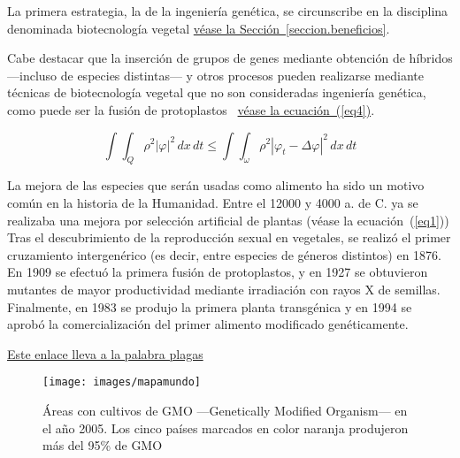 \documentclass[11pt,a4paper]{article}
\begin{document}
La primera estrategia, la de la ingeniería genética, se circunscribe en la disciplina denominada biotecnología vegetal
%
%
\hyperref[seccion.beneficios]{véase la Sección~\ref{seccion.beneficios}}.


Cabe destacar que la inserción de grupos de genes mediante obtención de híbridos ---incluso de especies distintas--- y otros procesos pueden realizarse mediante técnicas de biotecnología vegetal que no son consideradas ingeniería genética, como puede ser la fusión de protoplastos~\cite{padula1}
%
%
\hyperref[eq4]{véase la ecuación~(\ref{eq4})}.




\begin{equation}\label{eq1}
\int\!\!\!\int_Q\rho^2|\varphi|^2\,dx\,dt
\le
\int\!\!\!\int_\omega\rho^2|\varphi_t-\Delta\varphi|^2\,dx\,dt
\end{equation}



La mejora de las especies que serán usadas como alimento ha sido un motivo común en la historia de la Humanidad.
 Entre el 12000 y 4000 a. de C. ya se realizaba una mejora por selección artificial de plantas (véase la ecuación~(\ref{eq1})) Tras el descubrimiento de la reproducción sexual en vegetales, se realizó el primer cruzamiento intergenérico (es decir, entre especies de géneros distintos) en 1876. En 1909 se efectuó la primera fusión de protoplastos, y en 1927 se obtuvieron mutantes de mayor productividad mediante irradiación con rayos X de semillas.
Finalmente, en 1983 se produjo la primera planta transgénica y en 1994 se aprobó la comercialización del primer alimento modificado genéticamente.\cite{simon3}

%
%

\hyperlink{target.plagas}{Este enlace lleva a la palabra plagas}


\begin{figure}[h]
\centering
\texttt{[image: images/mapamundo]}
\caption[Producción mundial de GMO]{Áreas con cultivos de GMO ---Genetically Modified Organism--- en el año 2005. Los cinco países marcados en color naranja produjeron más 
del 95\% de GMO}
\label{mapamundo}
\end{figure}
\end{document}
